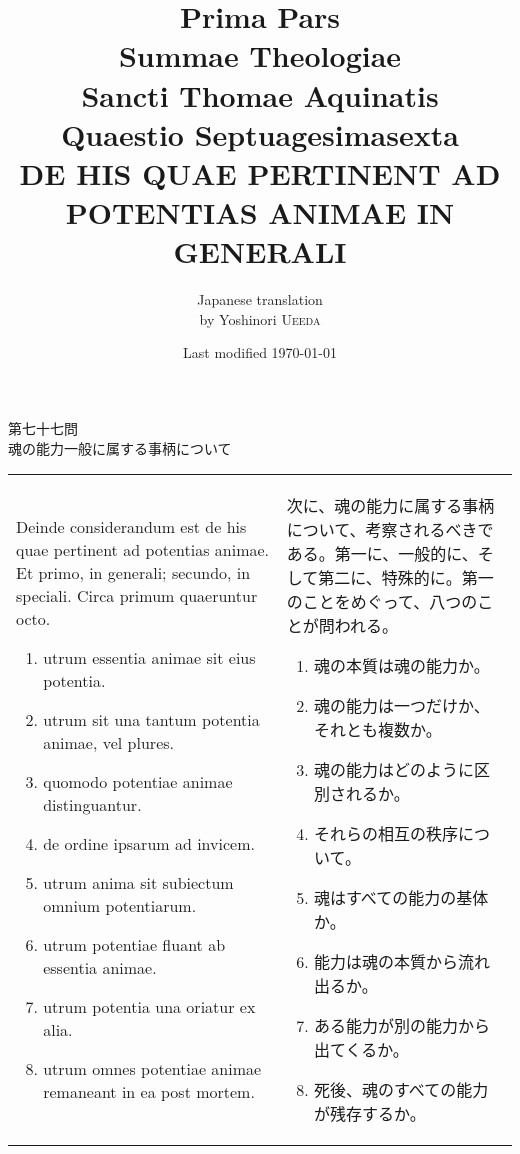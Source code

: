 \documentclass[paper=a4paper,fontsize=10pt,jafontsize=9pt,titlepage]{jlreq}
\title{{\bfseries Prima Pars}\\{\Huge Summae Theologiae}\\Sancti Thomae
Aquinatis\\{\sffamily Quaestio Septuagesimasexta}\\{\bfseries DE HIS QUAE PERTINENT AD POTENTIAS ANIMAE IN GENERALI}}
\author{Japanese translation\\by Yoshinori {\scshape Ueeda}}
\date{Last modified \today}
\begin{document}
\maketitle

\begin{center}
 {\Large 第七十七問\\魂の能力一般に属する事柄について}
\end{center}

\begin{longtable}{p{21em}p{21em}}
 Deinde considerandum est de his quae pertinent ad potentias animae. Et primo, in generali; secundo, in speciali. Circa primum quaeruntur octo.

 \begin{enumerate}
  \item utrum essentia animae sit eius potentia.
  \item utrum sit una tantum potentia animae, vel plures.
  \item quomodo potentiae animae distinguantur.
  \item de ordine ipsarum ad invicem.
  \item utrum anima sit subiectum omnium potentiarum.
  \item utrum potentiae fluant ab essentia animae.
  \item utrum potentia una oriatur ex alia.
  \item utrum omnes potentiae animae remaneant in ea post mortem.
 \end{enumerate}

 &

次に、魂の能力に属する事柄について、考察されるべきである。第一に、一般的に、そして第二に、特殊的に。第一のことをめぐって、八つのことが問われる。
 
 \begin{enumerate}
  \item 魂の本質は魂の能力か。
  \item 魂の能力は一つだけか、それとも複数か。
  \item 魂の能力はどのように区別されるか。
  \item それらの相互の秩序について。
  \item 魂はすべての能力の基体か。
  \item 能力は魂の本質から流れ出るか。
  \item ある能力が別の能力から出てくるか。
  \item 死後、魂のすべての能力が残存するか。
 \end{enumerate}

\end{longtable}
\newpage 
 
\end{document}
